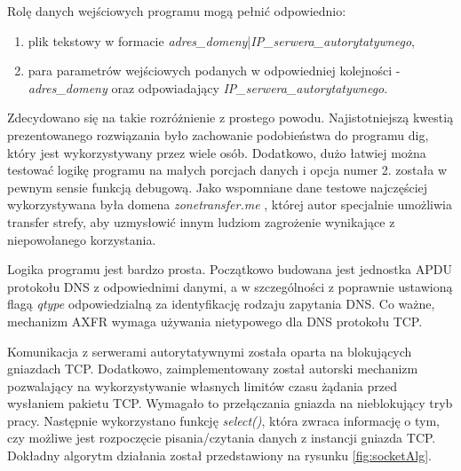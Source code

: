 Rolę danych wejściowych programu mogą pełnić odpowiednio:
\begin{enumerate}
	\item plik tekstowy w formacie \textit{adres\_domeny}|\textit{IP\_serwera\_autorytatywnego},
	\item para parametrów wejściowych podanych w odpowiedniej kolejności - \textit{adres\_domeny} oraz odpowiadający \textit{IP\_serwera\_autorytatywnego}.
\end{enumerate}
Zdecydowano się na takie rozróżnienie z prostego powodu. Najistotniejszą kwestią prezentowanego rozwiązania było
zachowanie podobieństwa do programu dig, który jest wykorzystywany przez wiele osób. Dodatkowo, dużo łatwiej można testować
logikę programu na małych
porcjach danych i opcja numer 2. została w pewnym sensie funkcją debugową. Jako wspomniane dane testowe najczęściej wykorzystywana
była domena \textit{zonetransfer.me} \cite{zonetransfer}, której autor specjalnie umożliwia transfer strefy, aby uzmysłowić innym
ludziom zagrożenie wynikające z niepowołanego korzystania.

Logika programu jest bardzo prosta. Początkowo budowana jest jednostka APDU protokołu DNS z odpowiednimi danymi, a w szczególności
z poprawnie ustawioną flagą \textit{qtype} odpowiedzialną za identyfikację rodzaju zapytania DNS. Co ważne, mechanizm AXFR wymaga
używania nietypowego dla DNS protokołu TCP.

Komunikacja z serwerami autorytatywnymi została oparta na blokujących gniazdach TCP. Dodatkowo, zaimplementowany został autorski
mechanizm pozwalający na wykorzystywanie własnych limitów czasu żądania przed wysłaniem pakietu TCP. Wymagało to przełączania
gniazda na nieblokujący tryb pracy. Następnie wykorzystano funkcję \textit{select()}, która zwraca informację o tym, czy możliwe jest
rozpoczęcie pisania/czytania danych z instancji gniazda TCP. Dokładny algorytm działania został przedstawiony na rysunku \ref{fig:socketAlg}.


